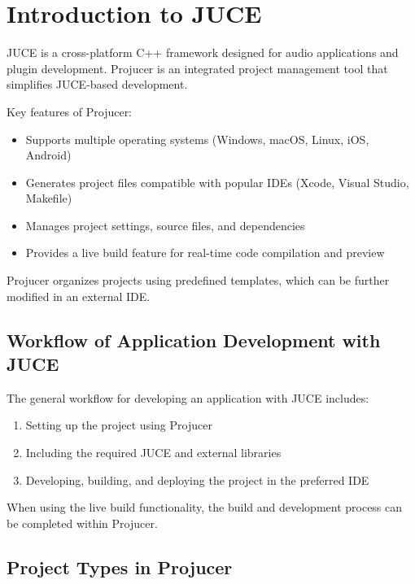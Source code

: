 
\chapter{Introduction to JUCE}

JUCE is a cross-platform C++ framework designed for audio applications and plugin development. Projucer is an integrated project management tool that simplifies JUCE-based development.

Key features of Projucer:

\begin{itemize}
    \item Supports multiple operating systems (Windows, macOS, Linux, iOS, Android)
    \item Generates project files compatible with popular IDEs (Xcode, Visual Studio, Makefile)
    \item Manages project settings, source files, and dependencies
    \item Provides a live build feature for real-time code compilation and preview
\end{itemize}

Projucer organizes projects using predefined templates, which can be further modified in an external IDE.

\section{Workflow of Application Development with JUCE}

The general workflow for developing an application with JUCE includes:

\begin{enumerate}
    \item Setting up the project using Projucer
    \item Including the required JUCE and external libraries
    \item Developing, building, and deploying the project in the preferred IDE
\end{enumerate}

When using the live build functionality, the build and development process can be completed within Projucer.

\section{Project Types in Projucer}

